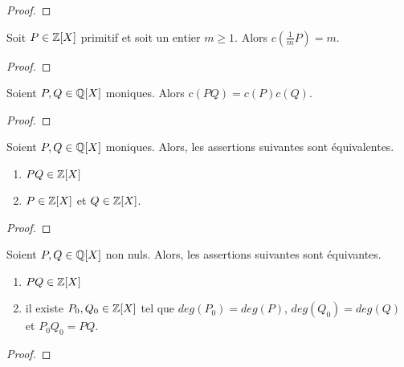 \ifdefined\outputproof
\begin{proof}

\end{proof}
\fi

\begin{lemma}
	Soit $P \in \mathbb{Z}[X]$ primitif et soit un entier $m \geq 1$. Alors
	$c(\frac{1}{m} P) = m$.
\end{lemma}

\ifdefined\outputproof
\begin{proof}

\end{proof}
\fi

\begin{lemma} [Gauss]
	\label{lemma:gauss}
	Soient $P, Q \in \mathbb{Q}[X]$ moniques. Alors $c(PQ) = c(P) c(Q)$.
\end{lemma}

\ifdefined\outputproof
\begin{proof}

\end{proof}
\fi

\begin{corollary}
	Soient $P, Q \in \mathbb{Q}[X]$ moniques. Alors, les assertions suivantes sont
	équivalentes.

	\begin{enumerate}
		\item $PQ \in \mathbb{Z}[X]$
		\item $P \in \mathbb{Z}[X]$ et $Q \in \mathbb{Z}[X]$.
	\end{enumerate}
\end{corollary}

\ifdefined\outputproof
\begin{proof}

\end{proof}
\fi

\begin{corollary}
	Soient $P, Q \in \mathbb{Q}[X]$ non nuls. Alors, les assertions suivantes sont
	équivantes.

	\begin{enumerate}
		\item $PQ \in \mathbb{Z}[X]$
		\item il existe $P_{0}, Q_{0} \in \mathbb{Z}[X]$ tel que $deg(P_{0}) =
			deg(P)$, $deg(Q_{0}) = deg(Q)$ et $P_{0} Q_{0} = PQ$.
	\end{enumerate}
\end{corollary}

\ifdefined\outputproof
\begin{proof}

\end{proof}
\fi

